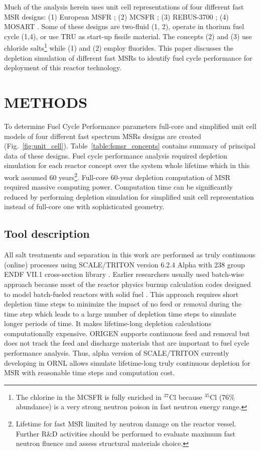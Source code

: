 \documentclass{anstrans}
\begin{document}
Much of the analysis herein uses unit cell representations of four different fast \gls{MSR} designs: 
(1) European \gls{MSFR} \cite{noauthor_final_2015}; (2) \gls{MCSFR} \cite{simmons_assessment_1974}; (3) REBUS-3700 \cite{mourogov_potentialities_2006}; (4) \gls{MOSART} \cite{ignatiev_progress_2007}. Some of these designs are two-fluid (1, 2), operate in thorium fuel cycle (1,4), or use \gls{TRU} as start-up fissile material. The concepts (2) and (3) use chloride salts\footnote{The chlorine in the \gls{MCSFR} is fully enriched in $^{37}$Cl because $^{35}$Cl (76\% abundance) is a very strong neutron poison in fast neutron energy range.} while (1) and (2) employ fluorides. This paper discusses the depletion simulation of different fast \glspl{MSR} to identify fuel cycle performance for deployment of this reactor technology.

\section{METHODS} 
\label{sec:methods}
To determine Fuel Cycle Performance parameters full-core and simplified unit cell models of four different fast spectrum \glspl{MSR} designs are created (Fig.~\ref{fig:unit_cell}).  Table~\ref{table:fsmsr_concepts} contains summary of principal data of these designs. Fuel cycle performance analysis required depletion simulation for each reactor concept over the system whole lifetime which in this work assumed 60 years\footnote{Lifetime for fast \gls{MSR} limited by neutron damage on the reactor vessel. Further R\&D activities should be performed to evaluate maximum fast neutron fluence and assess structural materials choice.}. Full-core 60-year depletion computation of \gls{MSR} required massive computing power. Computation time can be significantly reduced by performing depletion simulation for simplified unit cell representation instead of full-core one with sophisticated geometry.

\subsection{Tool description} 
All salt treatments and separation in this work are performed as truly continuous (online) processes using SCALE/TRITON version 6.2.4 Alpha \cite{betzler_molten_2017-1} with 238 group ENDF VII.1 cross-section library \cite{rearden_scale_2016}. Earlier researchers usually used batch-wise approach because most of the reactor physics burnup calculation codes designed to model batch-fueled reactors with solid fuel \cite{betzler_molten_2017, rykhlevskii_online_2017}. This approach requires short depletion time steps to minimize the impact of no feed or removal during the time step which leads to a large number of depletion time steps to simulate longer periods of time. It makes lifetime-long depletion calculations computationally expensive. ORIGEN \cite{gauld_isotopic_2011} supports continuous feed and removal but does not track the feed and discharge materials that are important to fuel cycle performance analysis. Thus, alpha version of SCALE/TRITON currently developing in \gls{ORNL} allows simulate lifetime-long truly continuous depletion for \gls{MSR} with reasonable time steps and computation cost.
\end{document}
